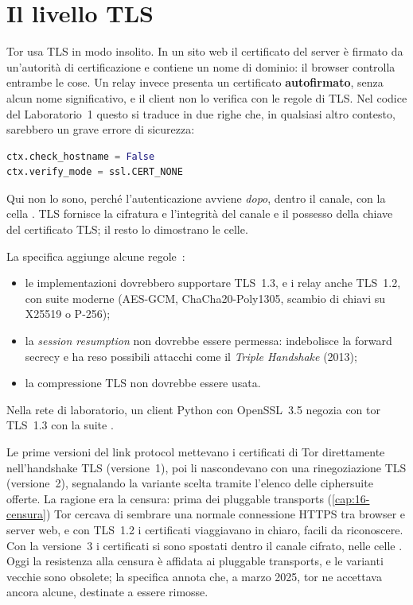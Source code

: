 \section{Il livello TLS}\label{sec:canale-tls}

Tor usa TLS in modo insolito. In un sito web il certificato del server è firmato da un'autorità di certificazione e contiene un nome di dominio: il browser controlla entrambe le cose. Un relay invece presenta un certificato \textbf{autofirmato}, senza alcun nome significativo, e il client non lo verifica con le regole di TLS. Nel codice del Laboratorio~1 questo si traduce in due righe che, in qualsiasi altro contesto, sarebbero un grave errore di sicurezza:
\begin{lstlisting}[language=Python,numbers=none]
ctx.check_hostname = False
ctx.verify_mode = ssl.CERT_NONE
\end{lstlisting}
Qui non lo sono, perché l'autenticazione avviene \emph{dopo}, dentro il canale, con la cella . TLS fornisce la cifratura e l'integrità del canale e il possesso della chiave del certificato TLS; il resto lo dimostrano le celle.

La specifica aggiunge alcune regole~:
\begin{itemize}
  \item le implementazioni dovrebbero supportare TLS~1.3, e i relay anche TLS~1.2, con suite moderne (AES-GCM, ChaCha20-Poly1305, scambio di chiavi su X25519 o P-256);
  \item la \emph{session resumption} non dovrebbe essere permessa: indebolisce la forward secrecy e ha reso possibili attacchi come il \emph{Triple Handshake} (2013);
  \item la compressione TLS non dovrebbe essere usata.
\end{itemize}
Nella rete di laboratorio, un client Python con OpenSSL~3.5 negozia con tor TLS~1.3 con la suite .

\begin{storia}
Le prime versioni del link protocol mettevano i certificati di Tor direttamente nell'handshake TLS (versione~1), poi li nascondevano con una rinegoziazione TLS (versione~2), segnalando la variante scelta tramite l'elenco delle ciphersuite offerte. La ragione era la censura: prima dei pluggable transports (\cref{cap:16-censura}) Tor cercava di sembrare una normale connessione HTTPS tra browser e server web, e con TLS~1.2 i certificati viaggiavano in chiaro, facili da riconoscere. Con la versione~3 i certificati si sono spostati dentro il canale cifrato, nelle celle . Oggi la resistenza alla censura è affidata ai pluggable transports, e le varianti vecchie sono obsolete; la specifica annota che, a marzo 2025, tor ne accettava ancora alcune, destinate a essere rimosse.
\end{storia}

